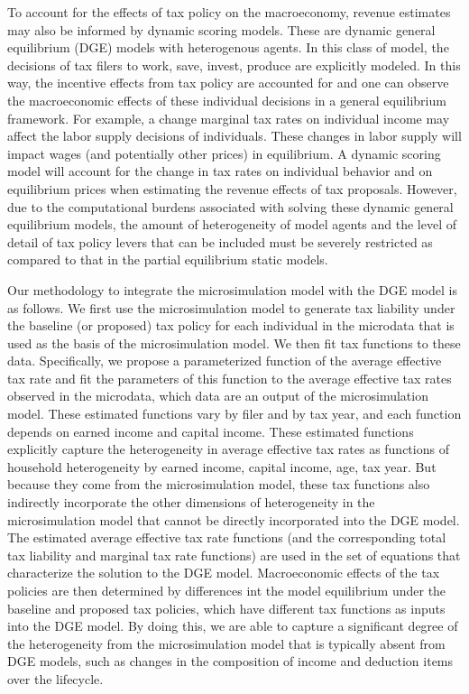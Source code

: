 \documentclass[letterpaper,12pt]{article}
\theoremstyle{definition}
\begin{document}
\begin{spacing}{1.5}
  To account for the effects of tax policy on the macroeconomy, revenue estimates may also be informed by dynamic scoring models. These are dynamic general equilibrium (DGE) models with heterogenous agents. In this class of model, the decisions of tax filers to work, save, invest, produce are explicitly modeled. In this way, the incentive effects from tax policy are accounted for and one can observe the macroeconomic effects of these individual decisions in a general equilibrium framework. For example, a change marginal tax rates on individual income may affect the labor supply decisions of individuals. These changes in labor supply will impact wages (and potentially other prices) in equilibrium. A dynamic scoring model will account for the change in tax rates on individual behavior and on equilibrium prices when estimating the revenue effects of tax proposals. However, due to the computational burdens associated with solving these dynamic general equilibrium models, the amount of heterogeneity of model agents and the level of detail of tax policy levers that can be included must be severely restricted as compared to that in the partial equilibrium static models.

  Our methodology to integrate the microsimulation model with the DGE model is as follows. We first use the microsimulation model to generate tax liability under the baseline (or proposed) tax policy for each individual in the microdata that is used as the basis of the microsimulation model. We then fit tax functions to these data.  Specifically, we propose a parameterized function of the average effective tax rate and fit the parameters of this function to the average effective tax rates observed in the microdata, which data are an output of the microsimulation model. These estimated functions vary by filer and by tax year, and each function depends on earned income and capital income. These estimated functions explicitly capture the heterogeneity in average effective tax rates as functions of household heterogeneity by earned income, capital income, age, tax year. But because they come from the microsimulation model, these tax functions also indirectly incorporate the other dimensions of heterogeneity in the microsimulation model that cannot be directly incorporated into the DGE model. The estimated average effective tax rate functions (and the corresponding total tax liability and marginal tax rate functions) are used in the set of equations that characterize the solution to the DGE model. Macroeconomic effects of the tax policies are then determined by differences int the model equilibrium under the baseline and proposed tax policies, which have different tax functions as inputs into the DGE model. By doing this, we are able to capture a significant degree of the heterogeneity from the microsimulation model that is typically absent from DGE models, such as changes in the composition of income and deduction items over the lifecycle.


\end{spacing}
\end{document}

